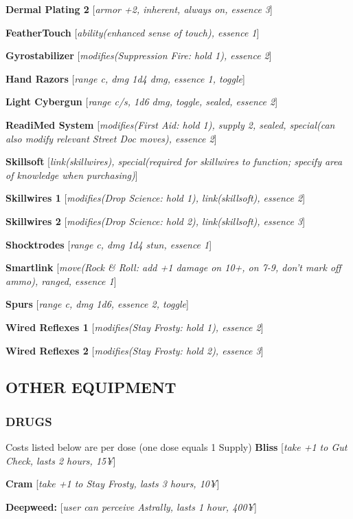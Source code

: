 \documentclass[oneside,10pt]{article}
\begin{document}
\begin{multicols}{2}
\textbf{Dermal Plating 2} [\textit{armor +2,
  inherent, always on, essence 3}]

\textbf{FeatherTouch} [\textit{ability(enhanced
  sense of touch), essence 1}]

\textbf{Gyrostabilizer} [\textit{modifies(Suppression Fire: hold 1), essence
2}]

\textbf{Hand Razors} [\textit{range c, dmg 1d4
  dmg, essence 1, toggle}]

\textbf{Light Cybergun} [\textit{range c/s, 1d6 dmg, toggle, sealed, essence 2}]

\textbf{ReadiMed System} [\textit{modifies(First Aid: hold 1), supply 2,
sealed, special(can also modify relevant Street Doc moves),
essence 2}]

\textbf{Skillsoft} [\textit{link(skillwires), special(required for skillwires to
function; specify area of knowledge when
purchasing)}]

\textbf{Skillwires 1} [\textit{modifies(Drop Science: hold 1), link(skillsoft),
essence 2}]

\textbf{Skillwires 2} [\textit{modifies(Drop Science: hold 2), link(skillsoft),
essence 3}]

\textbf{Shocktrodes} [\textit{range c, dmg 1d4
  stun, essence 1}]

\textbf{Smartlink} [\textit{move(Rock \& Roll: add +1 damage on 10+, on
7-9, don’t mark off ammo), ranged, essence 1}]

\textbf{Spurs} [\textit{range c, dmg 1d6, essence
  2, toggle}]

\textbf{Wired Reflexes 1} [\textit{modifies(Stay
  Frosty: hold 1), essence 2}]

\textbf{Wired Reflexes 2} [\textit{modifies(Stay
  Frosty: hold 2), essence 3}]


\subsection{OTHER EQUIPMENT}
\subsubsection{DRUGS}
Costs listed below are per dose (one dose equals 1 Supply)
\textbf{Bliss} [\textit{take +1 to Gut Check,
  lasts 2 hours, 15¥}]

\textbf{Cram} [\textit{take +1 to Stay Frosty,
  lasts 3 hours, 10¥}]

\textbf{Deepweed:} [\textit{user can perceive
  Astrally, lasts 1 hour, 400¥}]


\end{multicols}
\end{document}
